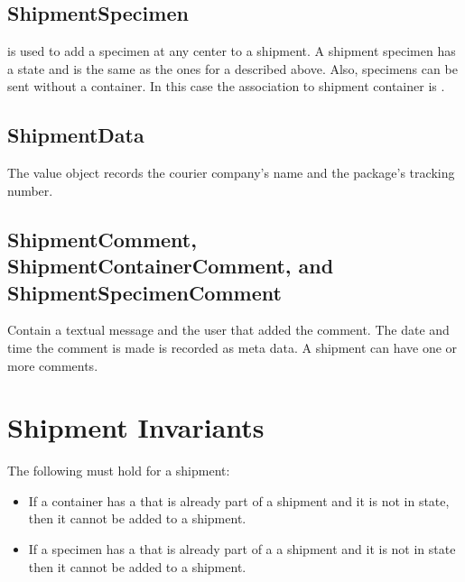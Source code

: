 \subsection*{ShipmentSpecimen}
 is used to add a specimen at any center to a
shipment.  A shipment specimen has a state and is the same as the ones for a
 described above. Also, specimens can be sent
without a container. In this case the association to shipment container is
.

\subsection*{ShipmentData}
The  value object records the courier company's name
and the package's tracking number.

\subsection*{ShipmentComment, ShipmentContainerComment, and
  ShipmentSpecimenComment}
\hypertarget{ShipmentComment}{}
\hypertarget{ShipmentContainerComment}{}
\hypertarget{ShipmentSpecimenComment}{}

Contain a textual message and the user that added the comment. The date and
time the comment is made is recorded as meta data. A shipment can have one or
more comments.

\section{Shipment Invariants}
The following must hold for a shipment:
\begin{itemize}
\item If a container has a  that is already part
  of a shipment and it is not in  state, then it cannot be
  added to a shipment.
\item If a specimen has a  that is already part of
  a a shipment and it is not in  state then it cannot be
  added to a shipment.
\end{itemize}

